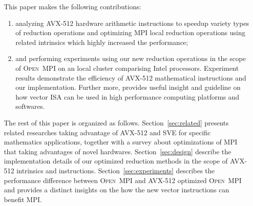\documentclass[sigconf]{acmart}
\newcommand{\ompi}[0]{\textsc{Open~MPI}\xspace}
\newcommand{\mpi}[0]{\textsc{MPI}\xspace}
\newcommand{\sve}[0]{\textsc{SVE}\xspace}
\begin{document}
This paper makes the following contributions:
\begin{enumerate}
  \item analyzing AVX-512 hardware arithmetic instructions to speedup variety types of reduction operations and optimizing \mpi local reduction operations using related intrinsics which highly increased the performance;
  \item and performing experiments using our
      new reduction operations in the scope of \ompi on an local cluster comparising Intel processors.
      Experiment results demonstrate the efficiency
      of AVX-512 mathematical instructions and our implementation.
      Further more, provides useful insight and guideline on how vector
      ISA can be used in high performance computing platforms and softwares.
\end{enumerate}

The rest of this paper is organized as follows.
Section~\ref{sec:related} presents related researches taking advantage of AVX-512 and \sve for specific mathematics applications, together with a survey about optimizations of \mpi that taking advantages of novel hardwares.
Section~\ref{sec:design} describe the implementation details of our optimized reduction methods in the scope of \ompiusing AVX-512 intrinsics and instructions.
Section~\ref{sec:experiments} describes the performance difference between \ompi and AVX-512 optimized \ompi and provides a distinct insights on the how the new vector instructions can benefit \mpi.
\end{document}
